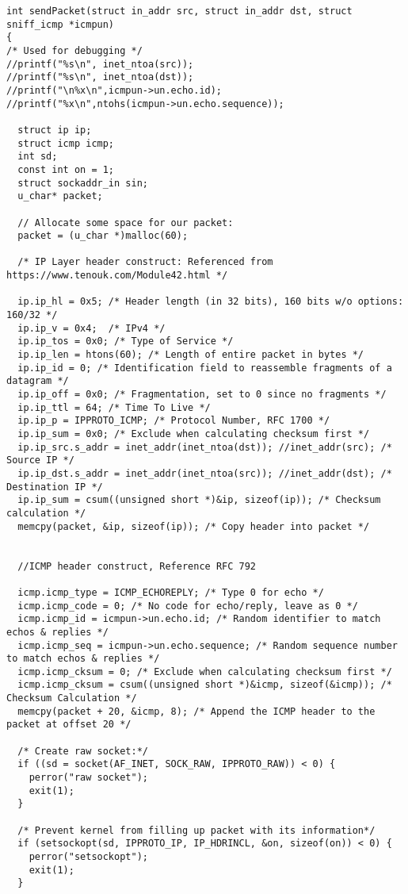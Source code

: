 \documentclass[a4paper,12pt]{article}
\begin{document}
\begin{verbatim}
int sendPacket(struct in_addr src, struct in_addr dst, struct sniff_icmp *icmpun)
{
/* Used for debugging */
//printf("%s\n", inet_ntoa(src));
//printf("%s\n", inet_ntoa(dst));
//printf("\n%x\n",icmpun->un.echo.id);
//printf("%x\n",ntohs(icmpun->un.echo.sequence));

  struct ip ip;
  struct icmp icmp;
  int sd;
  const int on = 1;
  struct sockaddr_in sin;
  u_char* packet;

  // Allocate some space for our packet:
  packet = (u_char *)malloc(60);
  
  /* IP Layer header construct: Referenced from https://www.tenouk.com/Module42.html */

  ip.ip_hl = 0x5; /* Header length (in 32 bits), 160 bits w/o options: 160/32 */
  ip.ip_v = 0x4;  /* IPv4 */
  ip.ip_tos = 0x0; /* Type of Service */
  ip.ip_len = htons(60); /* Length of entire packet in bytes */
  ip.ip_id = 0; /* Identification field to reassemble fragments of a datagram */
  ip.ip_off = 0x0; /* Fragmentation, set to 0 since no fragments */
  ip.ip_ttl = 64; /* Time To Live */
  ip.ip_p = IPPROTO_ICMP; /* Protocol Number, RFC 1700 */
  ip.ip_sum = 0x0; /* Exclude when calculating checksum first */
  ip.ip_src.s_addr = inet_addr(inet_ntoa(dst)); //inet_addr(src); /* Source IP */
  ip.ip_dst.s_addr = inet_addr(inet_ntoa(src)); //inet_addr(dst); /* Destination IP */
  ip.ip_sum = csum((unsigned short *)&ip, sizeof(ip)); /* Checksum calculation */
  memcpy(packet, &ip, sizeof(ip)); /* Copy header into packet */
  
  
  //ICMP header construct, Reference RFC 792
  
  icmp.icmp_type = ICMP_ECHOREPLY; /* Type 0 for echo */
  icmp.icmp_code = 0; /* No code for echo/reply, leave as 0 */
  icmp.icmp_id = icmpun->un.echo.id; /* Random identifier to match echos & replies */
  icmp.icmp_seq = icmpun->un.echo.sequence; /* Random sequence number to match echos & replies */
  icmp.icmp_cksum = 0; /* Exclude when calculating checksum first */
  icmp.icmp_cksum = csum((unsigned short *)&icmp, sizeof(&icmp)); /* Checksum Calculation */
  memcpy(packet + 20, &icmp, 8); /* Append the ICMP header to the packet at offset 20 */
  
  /* Create raw socket:*/
  if ((sd = socket(AF_INET, SOCK_RAW, IPPROTO_RAW)) < 0) {
    perror("raw socket");
    exit(1);
  }
  
  /* Prevent kernel from filling up packet with its information*/
  if (setsockopt(sd, IPPROTO_IP, IP_HDRINCL, &on, sizeof(on)) < 0) {
    perror("setsockopt");
    exit(1);
  }
  

\end{verbatim}
\end{document}
